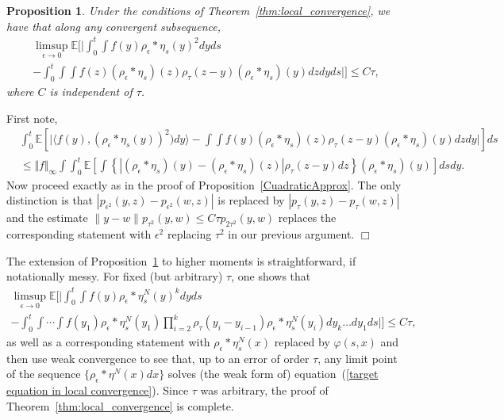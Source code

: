 \documentclass[12pt]{article}
\newenvironment {proof}{{\noindent\bf Proof }}{\hfill $\Box$ \medskip}
\newtheorem{proposition}[theorem]{Proposition}
\newcommand{\IE}{\mathbb E}
\numberwithin{equation}{section}
\begin{document}
\begin{proposition}
	\label{quadratic convergence}
Under the conditions of Theorem~\ref{thm:local_convergence}, we have that
along any convergent subsequence,
\begin{multline}
\label{approx4}
\limsup_{\epsilon \to 0}
\IE\Big[\Big|
\int_0^t\int f(y) \rho_\epsilon*\eta_s(y)^2 dy ds
\\
-
\int_0^t\int \int f(z) (\rho_\epsilon * \eta_s)(z) 
\rho_\tau (z-y) (\rho_\epsilon * \eta_s)(y) dz dy ds\Big|\Big]\leq C\tau,
\end{multline}
where $C$ is independent of $\tau$.
\end{proposition}
\begin{proof}
First note,
\begin{align}
&\int_0^t 
\mathbb{E}\left[\big| \langle f(y), (\rho_\epsilon*\eta_s(y))^2) dy \rangle 
- \int \int f(y) (\rho_\epsilon * \eta_s)(z) \rho_\tau (z-y) 
(\rho_\epsilon * \eta_s)(y) dz dy \big|\right] ds 
\nonumber 
\\ 
&\leq  
\Vert f \Vert_\infty \int  \int_0^t  
\mathbb{E}\left[ \int \left\{ \left|(\rho_\epsilon * \eta_s)(y)
-(\rho_\epsilon * \eta_s)(z) \right|   \rho_\tau(z-y) dz \right\} 
(\rho_\epsilon *\eta_s)(y) \right] ds  dy. 
\label{b1}
\end{align}
Now proceed exactly as in the proof of 
Proposition~\ref{CuadraticApprox}.
The only distinction is that $|p_{\epsilon^2}(y,z)-p_{\epsilon^2}(w,z)|$
is replaced by $|p_{\tau}(y,z)-p_{\tau}(w,z)|$ and 
the estimate $\|y-w\|p_{\tau^2}(y,w)\leq C\tau p_{2\tau^2}(y,w)$
replaces the corresponding statement with $\epsilon^2$ replacing 
$\tau^2$ in our previous argument.
\end{proof}

The extension of Proposition~\ref{quadratic convergence}
to higher moments is straightforward, if notationally messy. For 
fixed (but arbitrary) $\tau$, one shows that
\begin{multline*}
	\limsup_{\epsilon\to 0}
	\IE\Big[\Big|
	\int_0^t\int f(y)\rho_\epsilon*\eta_s^N(y)^k dy ds
\\
	- \int_0^t\int\cdots\int f(y_1)
	\rho_\epsilon*\eta_s^N(y_1) 
\prod_{i=2}^{k}\rho_\tau (y_i-y_{i-1})\rho_\epsilon*\eta_s^N(y_i)
dy_{k}\ldots dy_1 ds\Big| \Big]
	\leq C\tau,
\end{multline*}
as well as a corresponding statement with $\rho_\epsilon*\eta_s^N(x)$ replaced
by $\varphi(s,x)$ and then use weak convergence to see that, up to an error 
of order $\tau$, any limit point of
the sequence $\{\rho_\epsilon*\eta^N(x)dx\}$ solves (the weak form 
of) equation~(\ref{target equation in local convergence}).
Since $\tau$ was arbitrary, the proof of Theorem~\ref{thm:local_convergence}
is complete.
\end{document}
